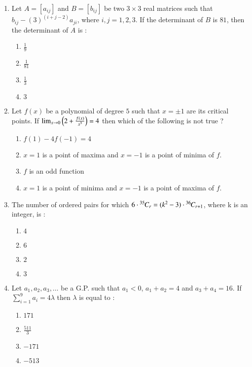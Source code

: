 \documentclass[journal,12pt,twocolumn]{IEEEtran}
\theoremstyle{remark}
\begin{document}
\begin{enumerate}
    \item Let $A=[a_{ij}]$ and $B=[b_{ij}]$ be two $3\times3$ real matrices such that $b_{ij}-(3)^{(i+j-2)}a_{ji}$, where $i,j=1,2,3$. If the determinant of $B$ is $81$, then the determinant of $A$ is :
        \begin{enumerate}
            \item $\frac{1}{9}$
            \item $\frac{1}{81}$
            \item $\frac{1}{3}$
            \item $3$
        \end{enumerate}

    \item Let $f(x)$ be a polynomial of degree $5$ such that $x=\pm1$ are its critical points. If $\lim_{x\to0}\left(2+\frac{f(x)}{x^3}\right)=4$ then which of the following is not true ?
        \begin{enumerate}
            \item $f(1)-4f(-1)=4$
            \item $x=1$ is a point of maxima and $x=-1$ is a point of minima of $f$.
            \item $f$ is an odd function
            \item $x=1$ is a point of minima and $x=-1$ is a point of maxima of $f$.
        \end{enumerate}

    \item The number of ordered pairs  for which $6\cdot{{}^{35}\mkern-1muC_{r}}=(k^2-3)\cdot{{}^{36}\mkern-1muC_{r+1}}$, where k is an integer, is :
        \begin{enumerate}
            \item $4$
            \item $6$
            \item $2$
            \item $3$
        \end{enumerate}

    \item Let $a_1,a_2,a_3,\dots$ be a G.P. such that $a_1<0$, $a_1+a_2=4$ and $a_3+a_4=16$. If $\sum_{i=1}^{9}a_i=4\lambda$ then $\lambda$ is equal to : 
        \begin{enumerate}
            \item $171$
            \item $\frac{511}{3}$
            \item $-171$
            \item $-513$
        \end{enumerate}


\end{enumerate}
\end{document}
